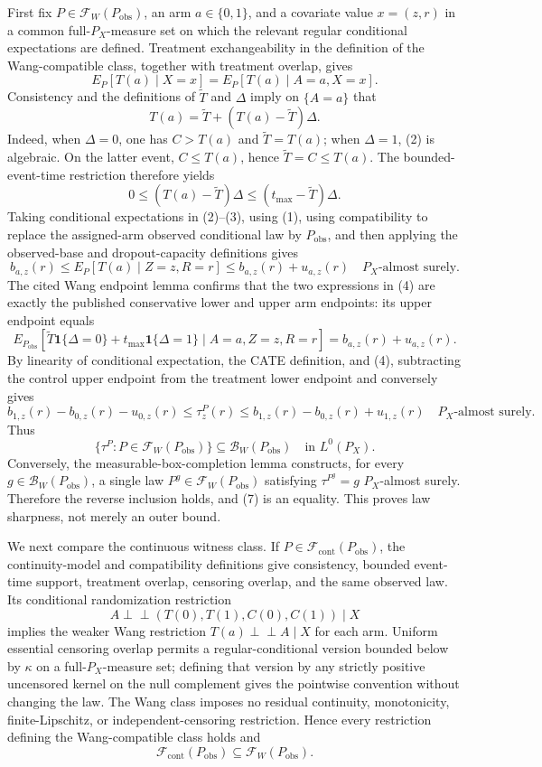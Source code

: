 First fix \(P\in\mathcal F_W(P_{\mathrm{obs}})\), an arm \(a\in\{0,1\}\), and a covariate value \(x=(z,r)\) in a common full-\(P_X\)-measure set on which the relevant regular conditional expectations are defined.  Treatment exchangeability in the definition of the Wang-compatible class, together with treatment overlap, gives
\[
E_P[T(a)\mid X=x]
=E_P[T(a)\mid A=a,X=x].
\tag{1}
\]
Consistency and the definitions of \(\widetilde T\) and \(\Delta\) imply on \(\{A=a\}\) that
\[
T(a)=\widetilde T+(T(a)-\widetilde T)\Delta.
\tag{2}
\]
Indeed, when \(\Delta=0\), one has \(C>T(a)\) and \(\widetilde T=T(a)\); when \(\Delta=1\), (2) is algebraic.  On the latter event, \(C\le T(a)\), hence \(\widetilde T=C\le T(a)\).  The bounded-event-time restriction therefore yields
\[
0\le (T(a)-\widetilde T)\Delta
\le (t_{\max}-\widetilde T)\Delta.
\tag{3}
\]
Taking conditional expectations in (2)--(3), using (1), using compatibility to replace the assigned-arm observed conditional law by \(P_{\mathrm{obs}}\), and then applying the observed-base and dropout-capacity definitions gives
\[
b_{a,z}(r)
\le E_P[T(a)\mid Z=z,R=r]
\le b_{a,z}(r)+u_{a,z}(r)
\quad P_X\text{-almost surely}.
\tag{4}
\]
The cited Wang endpoint lemma confirms that the two expressions in (4) are exactly the published conservative lower and upper arm endpoints: its upper endpoint equals
\[
E_{P_{\mathrm{obs}}}
[\widetilde T\mathbf 1\{\Delta=0\}+t_{\max}\mathbf 1\{\Delta=1\}
\mid A=a,Z=z,R=r]
=b_{a,z}(r)+u_{a,z}(r).
\tag{5}
\]
By linearity of conditional expectation, the CATE definition, and (4), subtracting the control upper endpoint from the treatment lower endpoint and conversely gives
\[
b_{1,z}(r)-b_{0,z}(r)-u_{0,z}(r)
\le\tau_z^P(r)\le
b_{1,z}(r)-b_{0,z}(r)+u_{1,z}(r)
\quad P_X\text{-almost surely}.
\tag{6}
\]
Thus
\[
\{\tau^P:P\in\mathcal F_W(P_{\mathrm{obs}})\}
\subseteq\mathcal B_W(P_{\mathrm{obs}})
\quad\text{in }L^0(P_X).
\tag{7}
\]
Conversely, the measurable-box-completion lemma constructs, for every \(g\in\mathcal B_W(P_{\mathrm{obs}})\), a single law \(P^g\in\mathcal F_W(P_{\mathrm{obs}})\) satisfying \(\tau^{P^g}=g\) \(P_X\)-almost surely.  Therefore the reverse inclusion holds, and (7) is an equality.  This proves law sharpness, not merely an outer bound.

We next compare the continuous witness class.  If \(P\in\mathcal F_{\mathrm{cont}}(P_{\mathrm{obs}})\), the continuity-model and compatibility definitions give consistency, bounded event-time support, treatment overlap, censoring overlap, and the same observed law.  Its conditional randomization restriction
\[
A\perp\!\!\!\perp(T(0),T(1),C(0),C(1))\mid X
\]
implies the weaker Wang restriction \(T(a)\perp\!\!\!\perp A\mid X\) for each arm.  Uniform essential censoring overlap permits a regular-conditional version bounded below by \(\kappa\) on a full-\(P_X\)-measure set; defining that version by any strictly positive uncensored kernel on the null complement gives the pointwise convention without changing the law.  The Wang class imposes no residual continuity, monotonicity, finite-Lipschitz, or independent-censoring restriction.  Hence every restriction defining the Wang-compatible class holds and
\[
\mathcal F_{\mathrm{cont}}(P_{\mathrm{obs}})
\subseteq\mathcal F_W(P_{\mathrm{obs}}).
\tag{8}
\]

